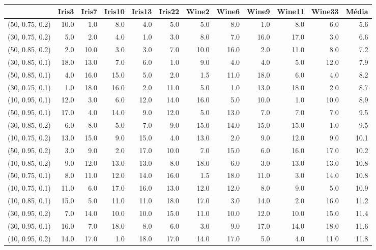 \begin{table}
\centering
\label{tab:ranks_Genetic}
\begin{tabular}{lrrrrrrrrrrr}
\toprule
{} &  Iris3 &  Iris7 &  Iris10 &  Iris13 &  Iris22 &  Wine2 &  Wine6 &  Wine9 &  Wine11 &  Wine33 &  Média \\
\midrule
(50, 0.75, 0.2) &   10.0 &    1.0 &     8.0 &     4.0 &     5.0 &    5.0 &    8.0 &    1.0 &     8.0 &     6.0 &    5.6 \\
(30, 0.75, 0.2) &    5.0 &    2.0 &     4.0 &     1.0 &     3.0 &    8.0 &    7.0 &   16.0 &    17.0 &     3.0 &    6.6 \\
(50, 0.85, 0.2) &    2.0 &   10.0 &     3.0 &     3.0 &     7.0 &   10.0 &   16.0 &    2.0 &    11.0 &     8.0 &    7.2 \\
(30, 0.85, 0.1) &   18.0 &   13.0 &     7.0 &     6.0 &     1.0 &    9.0 &    4.0 &    4.0 &     5.0 &    12.0 &    7.9 \\
(50, 0.85, 0.1) &    4.0 &   16.0 &    15.0 &     5.0 &     2.0 &    1.5 &   11.0 &   18.0 &     6.0 &     4.0 &    8.2 \\
(30, 0.75, 0.1) &    1.0 &   18.0 &    16.0 &     2.0 &    11.0 &    5.0 &    1.0 &   13.0 &    18.0 &     2.0 &    8.7 \\
(10, 0.95, 0.1) &   12.0 &    3.0 &     6.0 &    12.0 &    14.0 &   16.0 &    5.0 &   10.0 &     1.0 &    10.0 &    8.9 \\
(50, 0.95, 0.1) &   17.0 &    4.0 &    14.0 &     9.0 &    12.0 &    5.0 &   13.0 &    7.0 &     7.0 &     7.0 &    9.5 \\
(30, 0.85, 0.2) &    6.0 &    8.0 &     5.0 &     7.0 &     9.0 &   15.0 &   14.0 &   15.0 &    15.0 &     1.0 &    9.5 \\
(10, 0.75, 0.2) &   13.0 &   15.0 &     9.0 &    15.0 &     4.0 &   13.0 &    2.0 &    9.0 &    12.0 &     9.0 &   10.1 \\
(50, 0.95, 0.2) &    3.0 &    9.0 &     2.0 &    17.0 &    10.0 &    7.0 &   15.0 &    6.0 &    16.0 &    17.0 &   10.2 \\
(10, 0.85, 0.2) &    9.0 &   12.0 &    13.0 &    13.0 &     8.0 &   18.0 &    6.0 &    3.0 &    13.0 &    13.0 &   10.8 \\
(50, 0.75, 0.1) &    8.0 &   11.0 &    12.0 &    14.0 &    16.0 &    1.5 &   18.0 &   11.0 &     3.0 &    14.0 &   10.8 \\
(10, 0.75, 0.1) &   11.0 &    6.0 &    17.0 &    16.0 &    13.0 &   12.0 &   12.0 &    8.0 &     9.0 &     5.0 &   10.9 \\
(10, 0.85, 0.1) &   15.0 &    5.0 &    11.0 &    11.0 &    18.0 &   17.0 &    3.0 &   14.0 &     2.0 &    16.0 &   11.2 \\
(30, 0.95, 0.2) &    7.0 &   14.0 &    10.0 &    10.0 &    15.0 &   11.0 &   10.0 &   12.0 &    10.0 &    15.0 &   11.4 \\
(30, 0.95, 0.1) &   16.0 &    7.0 &    18.0 &     8.0 &     6.0 &    3.0 &    9.0 &   17.0 &    14.0 &    18.0 &   11.6 \\
(10, 0.95, 0.2) &   14.0 &   17.0 &     1.0 &    18.0 &    17.0 &   14.0 &   17.0 &    5.0 &     4.0 &    11.0 &   11.8 \\
\bottomrule
\end{tabular}
\end{table}
